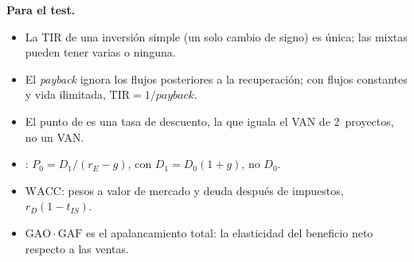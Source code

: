 \documentclass[11pt]{article}
\begin{document}
\begin{anotaciones}
\textbf{Para el test.}
\begin{itemize}
\item La TIR de una inversión simple (un solo cambio de signo) es única; las mixtas pueden tener varias o ninguna.
\item El \emph{payback} ignora los flujos posteriores a la recuperación; con flujos constantes y vida ilimitada, $\mathrm{TIR}=1/\textit{payback}$.
\item El punto de  es una tasa de descuento, la que iguala el VAN de 2~proyectos, no un VAN.
\item {}: $P_0=D_1/(r_E-g)$, con $D_1=D_0(1+g)$, no $D_0$.
\item $\mathrm{WACC}$: pesos a valor de mercado y deuda después de impuestos, $r_D(1-t_{IS})$.
\item $\mathrm{GAO}\cdot\mathrm{GAF}$ es el apalancamiento total: la elasticidad del beneficio neto respecto a las ventas.
\end{itemize}
\end{anotaciones}

\bibliografia
\end{document}

